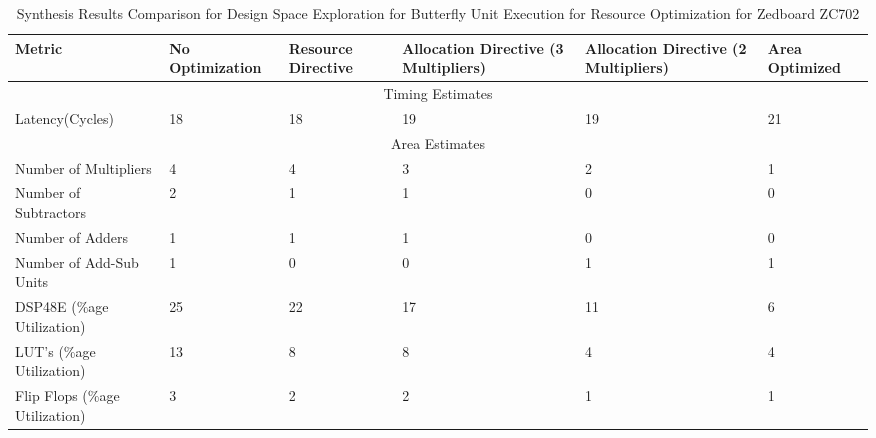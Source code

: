 \begin{table}[H]
\centering
\caption{Synthesis Results Comparison for Design Space Exploration for Butterfly Unit Execution for Resource Optimization for Zedboard ZC702}
\label{Table 4.1}
\begin{tabular}{||m{3cm}|m{2cm}|m{2cm}|m{2cm}|m{2cm}|m{2cm}||}
\hline
Metric & No Optimization & Resource Directive& Allocation Directive (3 Multipliers) & Allocation Directive (2 Multipliers) & Area Optimized  \\
\hline
\multicolumn{6}{||c||}{Timing Estimates}\\
\hline
Latency(Cycles) & 18 &18&19&19& 21\\
\hline
\multicolumn{6}{||c||}{Area Estimates}\\
\hline
Number of Multipliers & 4 & 4&3&2& 1\\
\hline
Number of Subtractors & 2 & 1&1&0&0\\
\hline
Number of Adders & 1 & 1&1&0&0\\
\hline
Number of Add-Sub Units & 1 & 0&0&1&1\\
\hline
DSP48E (\%age Utilization) & 25 & 22&17&11&6\\
\hline
LUT's (\%age Utilization) &13 & 8&8&4&4\\
\hline
Flip Flops (\%age Utilization) & 3 & 2&2&1&1\\
\hline
\end{tabular}

\end{table}